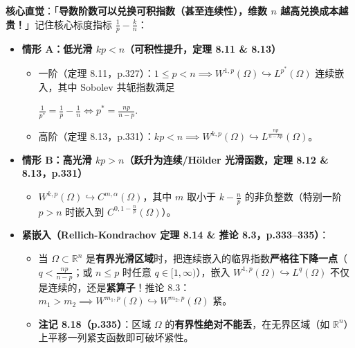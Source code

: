 \documentclass[11pt,a4paper]{article}
\providecommand{\tightlist}{\setlength{\itemsep}{2pt}\setlength{\parskip}{0pt}}
\renewenvironment{quote}{%
  \begin{tcolorbox}[
    enhanced,
    breakable,
    colback=AccentSoft!48!white,
    colframe=AccentMain,
    boxrule=0pt,
    leftrule=2.8pt,
    arc=2.5pt,
    left=9pt, right=8pt, top=6pt, bottom=6pt,
    before skip=5.5pt, after skip=5.5pt
  ]\small
}{%
  \end{tcolorbox}%
}
\newcommand{\FitDisplayMath}[1]{%
  \par\vspace{4.5pt}\noindent
  \begin{adjustbox}{max width=\linewidth, center}
    $\displaystyle #1$
  \end{adjustbox}
  \par\vspace{4.5pt}%
}
\begin{document}
\begin{quote}
\textbf{核心直觉}：「\textbf{导数阶数可以兑换可积指数（甚至连续性），维数 \(n\) 越高兑换成本越贵！}」记住核心标度指标 \(\frac{1}{p} - \frac{k}{n}\)：
\end{quote}

\begin{itemize}
\tightlist
\item
  \textbf{情形 A：低光滑 \(kp < n\)（可积性提升，定理 8.11 \& 8.13）}

  \begin{itemize}
  \tightlist
  \item
    一阶（定理 8.11，p.327）：\(1 \le p < n \implies W^{1,p}(\Omega) \hookrightarrow L^{p^*}(\Omega)\) 连续嵌入，其中 Sobolev 共轭指数满足 
\FitDisplayMath{\frac{1}{p^*} = \frac{1}{p} - \frac{1}{n} \iff p^* = \frac{np}{n - p}.}

  \item
    高阶（定理 8.13，p.331）：\(kp < n \implies W^{k,p}(\Omega) \hookrightarrow L^{\frac{np}{n-kp}}(\Omega)\)。
  \end{itemize}
\item
  \textbf{情形 B：高光滑 \(kp > n\)（跃升为连续/Hölder 光滑函数，定理 8.12 \& 8.13，p.331）}

  \begin{itemize}
  \tightlist
  \item
    \(W^{k,p}(\Omega) \hookrightarrow C^{m,\alpha}(\Omega)\)，其中 \(m\) 取小于 \(k - \frac{n}{p}\) 的非负整数（特别一阶 \(p > n\) 时嵌入到 \(C^{0, 1 - \frac{n}{p}}(\Omega)\)）。
  \end{itemize}
\item
  \textbf{紧嵌入（Rellich-Kondrachov 定理 8.14 \& 推论 8.3，p.333--335）}：

  \begin{itemize}
  \tightlist
  \item
    当 \(\Omega \subset \mathbb{R}^n\) 是\textbf{有界光滑区域}时，把连续嵌入的临界指数\textbf{严格往下降一点}（\(q < \frac{np}{n-p}\)；或 \(n \le p\) 时任意 \(q \in [1, \infty)\)），嵌入 \(W^{1,p}(\Omega) \hookrightarrow L^q(\Omega)\) 不仅是连续的，还是\textbf{紧算子}！推论 8.3：\(m_1 > m_2 \implies W^{m_1,p}(\Omega) \hookrightarrow W^{m_2,p}(\Omega)\) 紧。
  \item
    \textbf{注记 8.18（p.335）}：区域 \(\Omega\) 的\textbf{有界性绝对不能丢}，在无界区域（如 \(\mathbb{R}^n\)）上平移一列紧支函数即可破坏紧性。
  \end{itemize}
\end{itemize}
\end{document}
